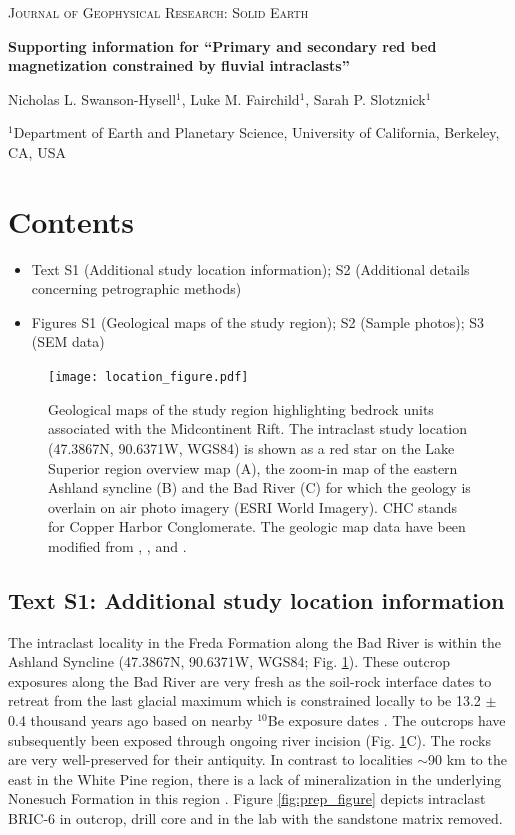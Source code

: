 \documentclass[11pt,letterpaper]{article}
\begin{document}
\begin{flushleft}
\textsc{Journal of Geophysical Research: Solid Earth}

{\Large \textbf{Supporting information for ``Primary and secondary red bed magnetization constrained by fluvial intraclasts''}}

Nicholas L. Swanson-Hysell$^{1}$, Luke M. Fairchild$^{1}$, Sarah P. Slotznick$^{1}$

$^{1}$Department of Earth and Planetary Science, University of California, Berkeley, CA, USA

\end{flushleft}

\section*{Contents}
\begin{itemize}
\item Text S1 (Additional study location information); S2 (Additional details concerning petrographic methods)
\item Figures S1 (Geological maps of the study region); S2 (Sample photos); S3 (SEM data)
\end{itemize}

\begin{figure}[!ht]
\noindent\texttt{[image: location\_figure.pdf]}
\caption{\small{Geological maps of the study region highlighting bedrock units associated with the Midcontinent Rift. The intraclast study location (47.3867\textdegree N, 90.6371\textdegree W, WGS84) is shown as a red star on the Lake Superior region overview map (A), the zoom-in map of the eastern Ashland syncline (B) and the Bad River (C) for which the geology is overlain on air photo imagery (ESRI World Imagery). CHC stands for Copper Harbor Conglomerate. The geologic map data have been modified from \cite{Survey2011a}, \cite{Nicholson2004a}, and \cite{Jirsa2011a}.}}
\label{fig:location_figure}
\end{figure} 

\subsection*{Text S1: Additional study location information}
The intraclast locality in the Freda Formation along the Bad River is within the Ashland Syncline (47.3867\textdegree N, 90.6371\textdegree W, WGS84; Fig. \ref{fig:location_figure}). These outcrop exposures along the Bad River are very fresh as the soil-rock interface dates to retreat from the last glacial maximum which is constrained locally to be 13.2 $\pm$ 0.4 thousand years ago based on nearby $^{10}$Be exposure dates \citep{Ullman2015a}. The outcrops have subsequently been exposed through ongoing river incision (Fig. \ref{fig:location_figure}C). The rocks are very well-preserved for their antiquity. In contrast to localities $\sim$90 km to the east in the White Pine region, there is a lack of mineralization in the underlying Nonesuch Formation in this region \citep{Stewart2017a}. Figure \ref{fig:prep_figure} depicts intraclast BRIC-6 in outcrop, drill core and in the lab with the sandstone matrix removed.
\end{document}
